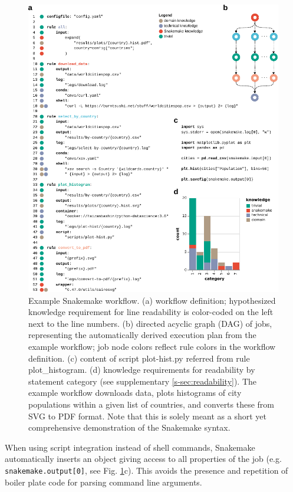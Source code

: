 \documentclass[parskip=half, DIV=18]{scrartcl}
\begin{document}
\begin{figure}
    \centering
	\includegraphics[width=12cm]{example-workflow.pdf}
	\caption{
		Example Snakemake workflow. (a) workflow definition; hypothesized knowledge requirement for line readability is color-coded on the left next to the line numbers. (b) directed acyclic graph (DAG) of jobs, representing the automatically derived execution plan from the example workflow; job node colors reflect rule colors in the workflow definition. (c) content of script plot-hist.py referred from rule plot\_histogram. (d) knowledge requirements for readability by statement category (see supplementary \autoref{s-sec:readability}).
		The example workflow downloads data, plots histograms of city populations within a given list of countries, and converts these from SVG to PDF format.
		Note that this is solely meant as a short yet comprehensive demonstration of the Snakemake syntax.
	}
	\label{fig:example}
\end{figure}

When using script integration instead of shell commands, Snakemake automatically inserts an object giving access to all properties of the job (e.g. \lstinline!snakemake.output[0]!, see Fig.
\ref{fig:example}c).
This avoids the presence and repetition of boiler plate code for parsing command line arguments.
\end{document}
